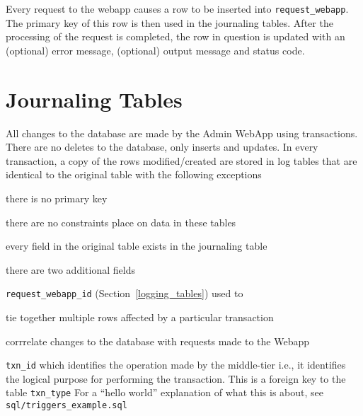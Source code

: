 \documentclass[letterpaper]{article}
\begin{document}
Every request to the webapp causes a row to be inserted into
\verb+request_webapp+. The primary key of this row is then used in the
journaling tables. After the processing of the request is completed, the row in
question is updated with an (optional) error message, (optional) output message and status code.

\section{Journaling Tables}
\label{journaling_tables}

All changes to the database are made by the Admin WebApp using transactions.
There are no deletes to the database, only inserts and updates. 
In every transaction, a copy of the rows modified/created are stored in log
tables that are identical to the original table with the following exceptions
\be
\item there is no primary key
\item there are no constraints place on data in these tables
\item every field in the original table exists in the journaling table
\item there are two additional fields
  \be
\item \verb+request_webapp_id+ (Section~\ref{logging_tables}) used to 
  \be
\item tie together multiple rows affected by a particular transaction
\item corrrelate changes to the database with requests made to the Webapp
  \ee
\item \verb+txn_id+ which identifies the operation made by the middle-tier i.e.,
  it identifies the logical purpose for performing the transaction. This is a
  foreign key to the table \verb+txn_type+
  \ee
  \ee
For a ``hello world'' explanation of what this is about, see 
\verb+sql/triggers_example.sql+
\end{document}
